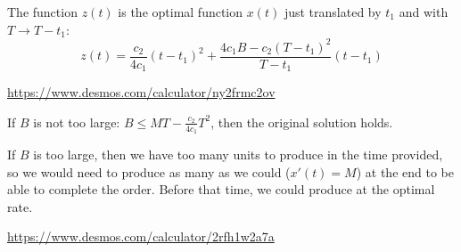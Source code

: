 \begin{solution}
\begin{slide}
\begin{parts}
	The function $z(t)$ is the optimal function $x(t)$ just translated by $t_1$ and with $T \to T-t_1$:
		\[ 
			z(t) = \frac{c_2}{4c_1} (t-t_1)^2 + \frac{4c_1 B-c_2 (T-t_1)^2}{T-t_1} (t-t_1)
		\]

	\url{https://www.desmos.com/calculator/ny2frmc2ov}
	
	\item If $B$ is not too large: $B\leq MT-\frac{c_{2}}{4c_{1}}T^{2}$, then the original solution holds.
		
		If $B$ is too large, then we have too many units to produce in the time provided, so we would need to produce as many as we could ($x'(t)=M$) at the end to be able to complete the order. 
		Before that time, we could produce at the optimal rate.

		\url{https://www.desmos.com/calculator/2rfh1w2a7a}
	
\end{parts}
\end{slide}
\end{solution}




